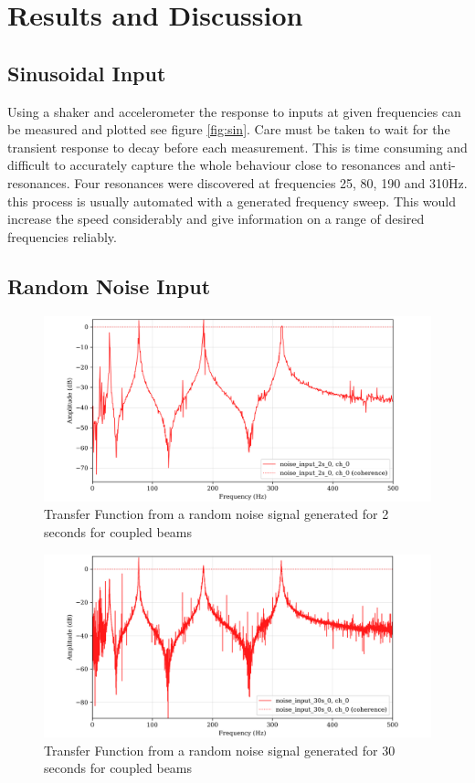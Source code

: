 \documentclass[twoside,onecolumn]{article}
\begin{document}
\section{Results and Discussion}
\subsection{Sinusoidal Input}

Using a shaker and accelerometer the response to inputs at given frequencies can be measured and plotted see figure \ref{fig:sin}. Care must be taken to wait for the transient response to decay before each measurement. This is time consuming and difficult to accurately capture the whole behaviour close to resonances and anti-resonances. Four resonances were discovered at frequencies 25, 80, 190 and 310Hz. this process is usually automated with a generated frequency sweep. This would increase the speed considerably and give information on a range of desired frequencies reliably.


\subsection{Random Noise Input}

\begin{figure}[!htb]
  \centering
    \includegraphics[width=\linewidth]{2-2snoiseTF}
  \caption{Transfer Function from a random noise signal generated for 2 seconds for coupled beams}
  \label{fig:n2tf}
\end{figure}
\begin{figure}[h]
  \centering
    \includegraphics[width=\linewidth]{2-30snoiseTF}
  \caption{Transfer Function from a random noise signal generated for 30 seconds for coupled beams}
  \label{fig:n30tf}
\end{figure}
\end{document}
